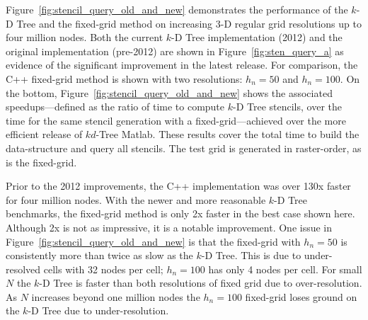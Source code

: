 \documentclass{report}
\begin{document}
Figure~\ref{fig:stencil_query_old_and_new} demonstrates the performance of the $k$-D Tree and the fixed-grid method on increasing 3-D regular grid resolutions up to four million nodes. Both the current $k$-D Tree implementation (2012) and the original implementation (pre-2012) are shown in Figure~\ref{fig:sten_query_a} as evidence of the significant improvement in the latest release. For comparison, the C++ fixed-grid method is shown with two resolutions: $h_n = 50$ and $h_n=100$. On the bottom, Figure~\ref{fig:stencil_query_old_and_new} shows the associated speedups---defined as the ratio of time to compute $k$-D Tree stencils, over the time for the same stencil generation with a fixed-grid---achieved over the more efficient release of $kd$-Tree Matlab. These results cover the total time to build the data-structure and query all stencils. The test grid is generated in raster-order, as is the fixed-grid. 


Prior to the 2012 improvements, the C++ implementation was over 130x faster for four million nodes. With the newer and more reasonable $k$-D Tree benchmarks, the fixed-grid method is only 2x faster in the best case shown here. Although 2x is not as impressive, it is a notable improvement. One issue in Figure~\ref{fig:stencil_query_old_and_new} is that the fixed-grid with $h_n=50$ is consistently more than twice as slow as the $k$-D Tree. This is due to under-resolved cells with 32 nodes per cell; $h_n=100$ has only 4 nodes per cell. For small $N$ the $k$-D Tree is faster than both resolutions of fixed grid due to over-resolution. As $N$ increases beyond one million nodes the $h_n=100$ fixed-grid loses ground on the $k$-D Tree due to under-resolution. 
\end{document}
